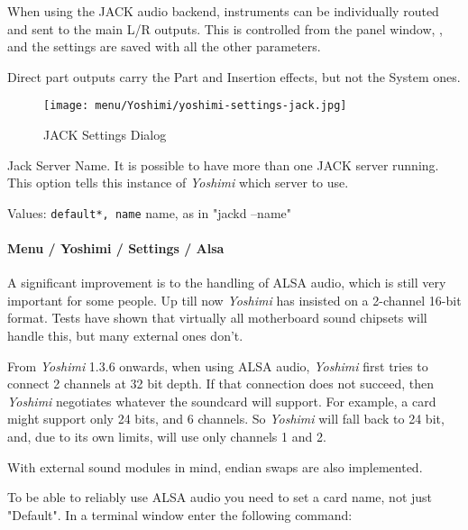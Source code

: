    When using the JACK audio backend, instruments can be individually routed
   and sent to the main L/R outputs. This is controlled from the
   panel window,
   ,
   and the settings are saved with all the other parameters.

   Direct part outputs carry the Part and Insertion effects, but not the
   System ones.

\begin{figure}[H]
   \centering 
   \texttt{[image: menu/Yoshimi/yoshimi-settings-jack.jpg]}
   \caption[JACK Settings]{JACK Settings Dialog}
   \label{fig:yoshimi_settings_jack}
\end{figure}

   \setcounter{ItemCounter}{0}      %

   Jack Server Name.
   It is possible to have more than one JACK server running.  This option
   tells this instance of \textsl{Yoshimi} which server to use.

   Values: \texttt{default*, name} name, as in "jackd --name"

\paragraph{Menu / Yoshimi / Settings / Alsa}
\label{paragraph:menu_yoshimi_settings_alsa}

   A significant improvement is to the handling of ALSA audio, which is still
   very important for some people. Up till now \textsl{Yoshimi} has insisted
   on a 2-channel 16-bit format. Tests have shown that virtually all
   motherboard sound chipsets will handle this, but many external ones don't.

   From \textsl{Yoshimi} 1.3.6 onwards, when using ALSA audio,
   \textsl{Yoshimi} first tries to connect 2 channels at 32 bit depth.  If
   that connection does not succeed, then \textsl{Yoshimi} negotiates
   whatever the soundcard will support.  For example, a card might support
   only 24 bits, and 6 channels.  So \textsl{Yoshimi} will fall back to
   24 bit, and, due to its own limits, will use only channels 1 and 2.

   With external sound modules in mind, endian swaps are also implemented.

   To be able to reliably use ALSA audio you need to set a card name, not just
   "Default".  In a terminal window enter the following command:

